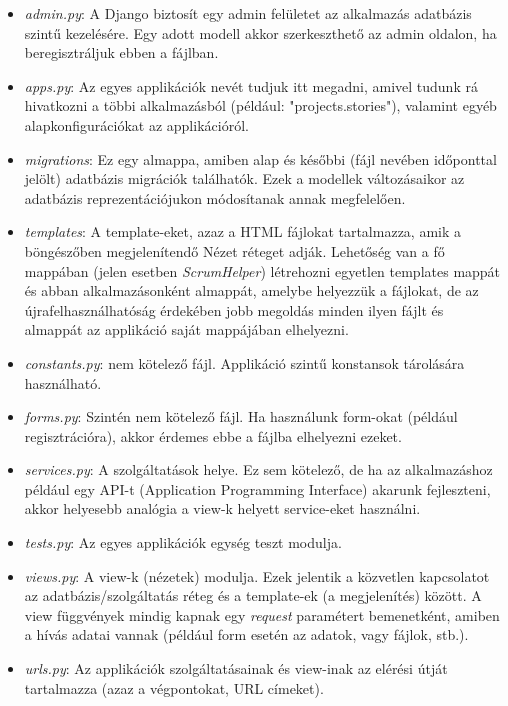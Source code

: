 \begin{itemize}
	\item \textit{admin.py}: A Django biztosít egy admin felületet az alkalmazás adatbázis szintű kezelésére. Egy adott modell akkor szerkeszthető az admin oldalon, ha beregisztráljuk ebben a fájlban.
	\item \textit{apps.py}: Az egyes applikációk nevét tudjuk itt megadni, amivel tudunk rá hivatkozni a többi alkalmazásból (például: "projects.stories"), valamint egyéb alapkonfigurációkat az applikációról.
	\item \textit{migrations}: Ez egy almappa, amiben alap és későbbi (fájl nevében időponttal jelölt) adatbázis migrációk találhatók. Ezek a modellek változásaikor az adatbázis reprezentációjukon módosítanak annak megfelelően.
	\item \textit{templates}: A template-eket, azaz a HTML fájlokat tartalmazza, amik a böngészőben megjelenítendő Nézet réteget adják. Lehetőség van a fő mappában (jelen esetben \textit{ScrumHelper}) létrehozni egyetlen templates mappát és abban alkalmazásonként almappát, amelybe helyezzük a fájlokat,   de az újrafelhasználhatóság érdekében jobb megoldás minden ilyen fájlt és almappát az applikáció saját mappájában elhelyezni.
	\item \textit{constants.py}: nem kötelező fájl. Applikáció szintű konstansok tárolására használható.
	\item \textit{forms.py}: Szintén nem kötelező fájl. Ha használunk form-okat (például regisztrációra), akkor érdemes ebbe a fájlba elhelyezni ezeket.
	\item \textit{services.py}: A szolgáltatások helye. Ez sem kötelező, de ha az alkalmazáshoz például egy API-t (Application Programming Interface) akarunk fejleszteni, akkor helyesebb analógia a view-k helyett service-eket használni.
	\item \textit{tests.py}: Az egyes applikációk egység teszt modulja.
	\item \textit{views.py}: A view-k (nézetek) modulja. Ezek jelentik a közvetlen kapcsolatot az adatbázis/szolgáltatás réteg és a template-ek (a megjelenítés) között. A view függvények mindig kapnak egy \textit{request} paramétert bemenetként, amiben a hívás adatai vannak (például form esetén az adatok, vagy fájlok, stb.).
	\item \textit{urls.py}: Az applikációk szolgáltatásainak és view-inak az elérési útját tartalmazza (azaz a végpontokat, URL címeket).
\end{itemize}

